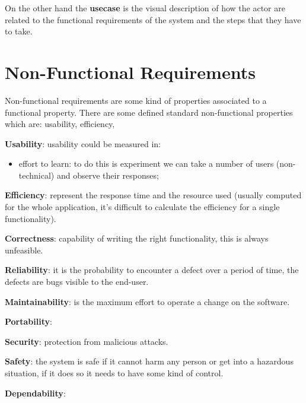 \documentclass[12pt]{article}
\begin{document}
On the other hand the \textbf{usecase} is the visual description of how the actor are related to the functional requirements of the system and the steps that they have to take.





\section{Non-Functional Requirements}
Non-functional requirements are some kind of properties associated to a functional property. There are some defined standard non-functional properties which are: usability, efficiency,

\textbf{Usability}: usability could be measured in:
\begin{itemize}
  \item effort to learn: to do this is experiment we can take a number of users (non-technical) and observe their responses;
\end{itemize}

\textbf{Efficiency}: represent the response time and the resource used (usually computed for the whole application, it's difficult to calculate the efficiency for a single functionality).

\textbf{Correctness}: capability of writing the right functionality, this is always unfeasible.


\textbf{Reliability}: it is the probability to encounter a defect over a period of time, the defects are bugs visible to the end-user.

\textbf{Maintainability}: is the maximum effort to operate a change on the software.

\textbf{Portability}:

\textbf{Security}: protection from malicious attacks.

\textbf{Safety}: the system is safe if it cannot harm any person or get into a hazardous situation, if it does so it needs to have some kind of control.

\textbf{Dependability}:
\end{document}
